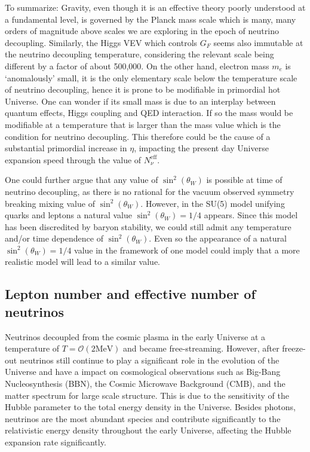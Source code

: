 To summarize: Gravity, even though it is an effective theory poorly understood at a fundamental level, is governed by the Planck mass scale which is many, many orders of magnitude above scales we are exploring in the epoch of neutrino decoupling. Similarly, the Higgs VEV which controls $G_F$ seems also immutable at the neutrino decoupling temperature, considering the relevant scale being different by a factor of about 500,000. On the other hand, electron mass $m_e$ is `anomalously' small, it is the only elementary scale below the temperature scale of neutrino decoupling, hence it is prone to be modifiable in primordial hot Universe. One can wonder if its small mass is due to an interplay between quantum effects, Higgs coupling and QED interaction. If so the mass would be modifiable at a temperature that is larger than the mass value which is the condition for neutrino decoupling. This therefore could be the cause of a substantial primordial increase in $\eta$, impacting the present day Universe expansion speed through the value of $N_\nu^\mathrm{eff}$.
 
One could further argue that any value of $\sin^2(\theta_W)$ is possible at time of neutrino decoupling, as there is no rational for the vacuum observed symmetry breaking mixing value of $\sin^2(\theta_W)$. However, in the SU(5) model unifying quarks and leptons a natural value $\sin^2(\theta_W)=1/4$ appears. Since this model has been discredited by baryon stability, we could still admit any temperature and/or time dependence of $\sin^2(\theta_W)$. Even so the appearance of a natural $\sin^2(\theta_W)=1/4$ value in the framework of one model could imply that a more realistic model will lead to a similar value.


\subsection{Lepton number and effective number of neutrinos}\label{sec:NeffIntro}

Neutrinos decoupled from the cosmic plasma in the early Universe at a temperature of $T=\mathcal{O}(2\mathrm{MeV})$ and became free-streaming. However, after freeze-out neutrinos still continue to play a significant role in the evolution of the Universe and have a impact on cosmological observations such as Big-Bang Nucleosynthesis (BBN), the Cosmic Microwave Background (CMB), and the matter spectrum for large scale structure. This is due to the sensitivity of the Hubble parameter to the total energy density in the Universe. Besides photons, neutrinos are the most abundant species and contribute significantly to the relativistic energy density throughout the early Universe, affecting the Hubble expansion rate significantly. 

